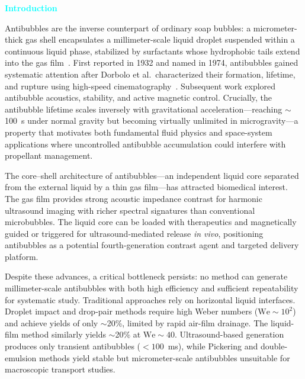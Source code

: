 \documentclass[%
 preprint,
 superscriptaddress,
 amsmath,amssymb,
 aps, prl,
]{revtex4-2}
\begin{document}
\maketitle

\textcolor{cyan}{\textbf{Introduction}}\par

Antibubbles are the inverse counterpart of ordinary soap bubbles: a micrometer-thick gas shell encapsulates a millimeter-scale liquid droplet suspended within a continuous liquid phase, stabilized by surfactants whose hydrophobic tails extend into the gas film~\cite{s_dorbolo_fluid_2003,dorbolo_aging_2005}. First reported in 1932 and named in 1974, antibubbles gained systematic attention after Dorbolo et al.\ characterized their formation, lifetime, and rupture using high-speed cinematography~\cite{s_dorbolo_fluid_2003}. Subsequent work explored antibubble acoustics, stability, and active magnetic control. Crucially, the antibubble lifetime scales inversely with gravitational acceleration---reaching $\sim$100~s under normal gravity but becoming virtually unlimited in microgravity---a property that motivates both fundamental fluid physics and space-system applications where uncontrolled antibubble accumulation could interfere with propellant management.\par

The core--shell architecture of antibubbles---an independent liquid core separated from the external liquid by a thin gas film---has attracted biomedical interest. The gas film provides strong acoustic impedance contrast for harmonic ultrasound imaging with richer spectral signatures than conventional microbubbles. The liquid core can be loaded with therapeutics and magnetically guided or triggered for ultrasound-mediated release \textit{in vivo}, positioning antibubbles as a potential fourth-generation contrast agent and targeted delivery platform.\par

Despite these advances, a critical bottleneck persists: no method can generate millimeter-scale antibubbles with both high efficiency and sufficient repeatability for systematic study. Traditional approaches rely on horizontal liquid interfaces. Droplet impact and drop-pair methods require high Weber numbers ($\text{We} \sim 10^2$) and achieve yields of only $\sim$20\%, limited by rapid air-film drainage. The liquid-film method similarly yields $\sim$20\% at $\text{We} \sim 40$. Ultrasound-based generation produces only transient antibubbles ($<100$~ms), while Pickering and double-emulsion methods yield stable but micrometer-scale antibubbles unsuitable for macroscopic transport studies.\par
\end{document}
